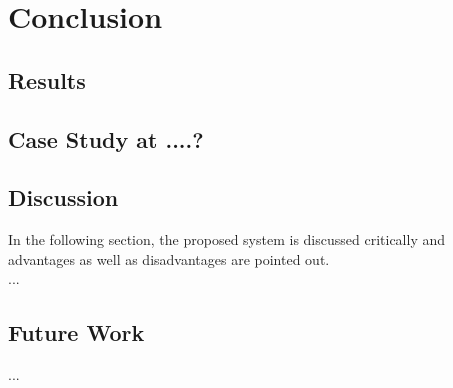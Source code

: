 \chapter{Conclusion}



\section{Results}


\section{Case Study at ....? }


\section{Discussion}

In the following section, the proposed system is discussed critically and advantages as well as disadvantages are pointed out. \\

...

\section{Future Work}

...